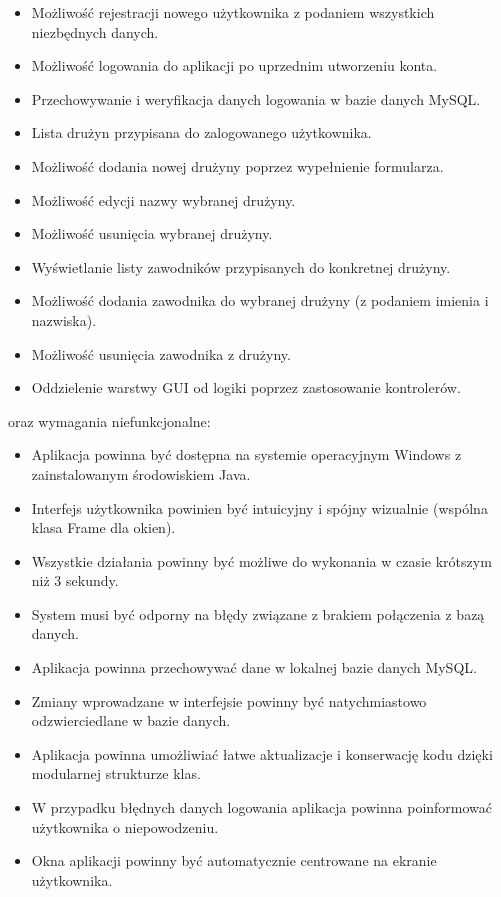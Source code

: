 \documentclass{urdpl}     %
\begin{document}
\begin{itemize}
  \item Możliwość rejestracji nowego użytkownika z podaniem wszystkich niezbędnych danych.
  \item Możliwość logowania do aplikacji po uprzednim utworzeniu konta.
  \item Przechowywanie i weryfikacja danych logowania w bazie danych MySQL.
  \item Lista drużyn przypisana do zalogowanego użytkownika.
  \item Możliwość dodania nowej drużyny poprzez wypełnienie formularza.
  \item Możliwość edycji nazwy wybranej drużyny.
  \item Możliwość usunięcia wybranej drużyny.
  \item Wyświetlanie listy zawodników przypisanych do konkretnej drużyny.
  \item Możliwość dodania zawodnika do wybranej drużyny (z podaniem imienia i nazwiska).
  \item Możliwość usunięcia zawodnika z drużyny.
  \item Oddzielenie warstwy GUI od logiki poprzez zastosowanie kontrolerów.
\end{itemize}

oraz wymagania niefunkcjonalne:

\begin{itemize}
  \item Aplikacja powinna być dostępna na systemie operacyjnym Windows z zainstalowanym środowiskiem Java.
  \item Interfejs użytkownika powinien być intuicyjny i spójny wizualnie (wspólna klasa Frame dla okien).
  \item Wszystkie działania powinny być możliwe do wykonania w czasie krótszym niż 3 sekundy.
  \item System musi być odporny na błędy związane z brakiem połączenia z bazą danych.
  \item Aplikacja powinna przechowywać dane w lokalnej bazie danych MySQL.
  \item Zmiany wprowadzane w interfejsie powinny być natychmiastowo odzwierciedlane w bazie danych.
  \item Aplikacja powinna umożliwiać łatwe aktualizacje i konserwację kodu dzięki modularnej strukturze klas.
  \item W przypadku błędnych danych logowania aplikacja powinna poinformować użytkownika o niepowodzeniu.
  \item Okna aplikacji powinny być automatycznie centrowane na ekranie użytkownika.
\end{itemize}
\end{document}
